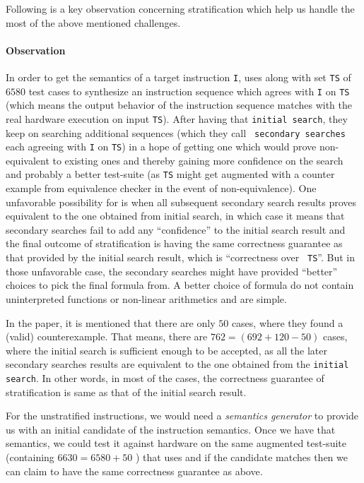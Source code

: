 Following is a key observation concerning stratification which help us handle
the most of the above mentioned challenges.

\paragraph{Observation} In order to get the semantics of a target instruction
{\tt I}, \Strata uses \Stoke along with set {\tt TS} of $6580$ test cases to
synthesize an instruction sequence which agrees with {\tt I} on {\tt TS} (which
    means the output behavior of the instruction sequence matches with the real
    hardware execution on input {\tt TS}). After having that {\tt initial
  search}, they keep on searching  additional sequences (which they call {\tt
      secondary searches} each agreeing with {\tt I} on {\tt TS}) in a hope of
  getting  one which would prove non-equivalent to existing ones and thereby
  gaining more confidence on the search and probably a better test-suite (as
      {\tt TS} might get augmented with a counter example from equivalence
      checker in the event of non-equivalence). One unfavorable possibility for
  \Strata is when all subsequent secondary search results proves  equivalent to
  the one obtained from initial search, in which case it  means that  secondary
  searches fail to add any ``confidence'' to the initial search result and the
  final outcome of stratification is having the same correctness guarantee as
  that provided by the initial search result, which is ``correctness over {\tt
    TS}''. But in those unfavorable case, the secondary searches might have
    provided ``better'' choices to pick the final formula from. A better choice
    of formula do not contain uninterpreted functions or  non-linear arithmetics
    and are simple.  
    
   In the paper\cite{Heule2016a}, it is mentioned that there are only $50$
   cases, where they found a (valid) counterexample. That means, there are $762
   = (692 + 120 - 50)$ cases, where the initial search is sufficient enough to
   be accepted, as all the later secondary searches results are equivalent to
   the one obtained from the {\tt initial search}. In other words, in  most of
   the cases, the correctness guarantee of stratification is same as that of the
   initial search result. 
   
   For the unstratified instructions, we would need a \emph{semantics generator}
   to provide us with an initial candidate of the instruction semantics. Once we
   have that semantics, we could test it against hardware on the same augmented
   test-suite (containing $6630 = 6580 + 50$ ) that \Stoke uses and if the
   candidate  matches then we can claim to have the same correctness guarantee
   as above. 
   

